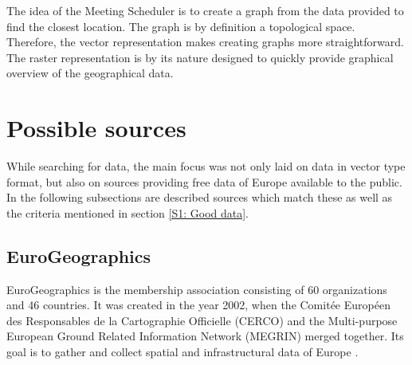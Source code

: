 \documentclass[thesis=M,english]{FITthesis}[2012/10/20]
\begin{document}


The idea of the Meeting Scheduler is to create a graph from the data provided to find the closest location. The graph is by definition a topological space. Therefore, the vector representation makes creating graphs more straightforward. The raster representation is by its nature designed to quickly provide graphical overview of the geographical data.

\section{Possible sources}
\label{sec:posSources}

While searching for data, the main focus was not only laid on data in vector type format, but also on sources providing free data of Europe available to the public. In the following subsections are described sources which match these as well as the criteria mentioned in section \ref{S1: Good data}.

 
\subsection{EuroGeographics}
EuroGeographics is the membership association consisting of 60 organizations and 46 countries. It was created in the year 2002, when the Comit{\' e}e Europ{\' e}en des Responsables de la Cartographie Officielle (CERCO) and the Multi-purpose European Ground Related Information Network (MEGRIN) merged together. Its goal is to gather and collect spatial and infrastructural data of Europe \cite{Euro16}. 
\end{document}
